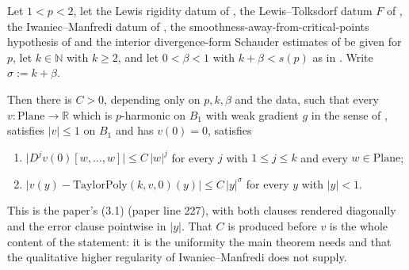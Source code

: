 \begin{lemma}
Let $1<p<2$, let the Lewis rigidity datum of , the Lewis--Tolksdorf
datum $F$ of , the Iwaniec--Manfredi datum of
, the smoothness-away-from-critical-points hypothesis of
 and the interior divergence-form Schauder estimates of
 be given for $p$, let $k\in\mathbb{N}$ with $k\ge2$, and let
$0<\beta<1$ with $k+\beta<s(p)$ as in .  Write $\sigma:=k+\beta$.

Then there is $C>0$, depending only on $p,k,\beta$ and the data, such that every
$v\colon\mathrm{Plane}\to\mathbb{R}$ which is $p$-harmonic on $B_1$ with weak gradient $g$ in
the sense of , satisfies $\lvert v\rvert\le1$ on $B_1$ and has $v(0)=0$,
satisfies
\begin{enumerate}
\item $\bigl\lvert D^{j}v(0)[w,\ldots,w]\bigr\rvert\le C\,\lvert w\rvert^{j}$ for every $j$ with
  $1\le j\le k$ and every $w\in\mathrm{Plane}$;
\item $\bigl\lvert v(y)-\mathrm{TaylorPoly}(k,v,0)(y)\bigr\rvert\le C\,\lvert y\rvert^{\sigma}$
  for every $y$ with $\lvert y\rvert<1$.
\end{enumerate}

This is the paper's (3.1) (paper line 227), with both clauses rendered diagonally
and the error clause pointwise in $\lvert y\rvert$.  That $C$ is produced before $v$ is the
whole content of the statement: it is the uniformity the main theorem needs and that the
qualitative higher regularity of Iwaniec--Manfredi does not supply.
\end{lemma}
